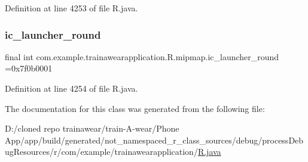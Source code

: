 Definition at line 4253 of file R.\+java.

\mbox{\label{classcom_1_1example_1_1trainawearapplication_1_1_r_1_1mipmap_a9fa53e4ffcc464ff3e40e922985284cc}} 
\subsubsection{\texorpdfstring{ic\_launcher\_round}{ic\_launcher\_round}}
{\footnotesize\ttfamily final int com.\+example.\+trainawearapplication.\+R.\+mipmap.\+ic\+\_\+launcher\+\_\+round =0x7f0b0001\hspace{0.3cm}{\ttfamily [static]}}



Definition at line 4254 of file R.\+java.



The documentation for this class was generated from the following file\+:\begin{DoxyCompactItemize}
\item 
D\+:/cloned repo trainawear/train-\/\+A-\/wear/\+Phone App/app/build/generated/not\+\_\+namespaced\+\_\+r\+\_\+class\+\_\+sources/debug/process\+Debug\+Resources/r/com/example/trainawearapplication/\mbox{\hyperlink{process_debug_resources_2r_2com_2example_2trainawearapplication_2_r_8java}{R.\+java}}\end{DoxyCompactItemize}
